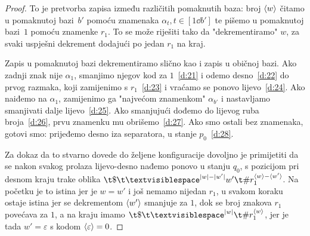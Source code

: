 \begin{proof}
To je pretvorba zapisa između različitih pomaknutih baza: broj $\langle w\rangle$ čitamo u pomaknutoj bazi~$b'$ pomoću znamenaka $\alpha_t,t\in[1\dd b']$ te pišemo u pomaknutoj bazi~$1$ pomoću znamenke $r_1$. To se može riješiti tako da "dekrementiramo" $w$, za svaki uspješni dekrement dodajući po jedan $r_1$ na kraj.

Zapis u pomaknutoj bazi dekrementiramo slično kao i zapis u običnoj bazi. Ako zadnji znak nije $\alpha_1$, smanjimo njegov kod za $1$~\eqref{d:21} i odemo desno~\eqref{d:22} do prvog razmaka, koji zamijenimo s $r_1$~\eqref{d:23} i vraćamo se ponovo lijevo~\eqref{d:24}. Ako naiđemo na $\alpha_1$, zamijenimo ga "najvećom znamenkom" $\alpha_{b'}$ i nastavljamo smanjivati dalje lijevo~\eqref{d:25}. Ako smanjujući dođemo do lijevog ruba broja~\eqref{d:26}, prvu znamenku mu obrišemo~\eqref{d:27}. Ako smo ostali bez znamenaka, gotovi smo: prijeđemo desno iza separatora, u stanje $p_0$~\eqref{d:28}.

Za dokaz da to stvarno dovede do željene konfiguracije dovoljno je primijetiti da se nakon svakog prolaza lijevo-desno  nađemo ponovo u stanju $q_0$, s pozicijom pri desnom kraju trake oblika $\t\$\bl^{\dulj w-\dulj{w'}}w'\t\#r_1^{\kr w-\kr{w'}}$. Na početku je to istina jer je $w=w'$ i još nemamo nijedan $r_1$, u svakom koraku ostaje istina jer se dekrementom $\langle w'\rangle$ smanjuje za $1$, dok se broj znakova $r_1$ povećava za $1$, a na kraju imamo $\t\$\bl^{\dulj w}\t\#r_1^{\kr w}$, jer je tada $w'=\varepsilon$ s kodom $\langle\varepsilon\rangle=0$.
\end{proof}

